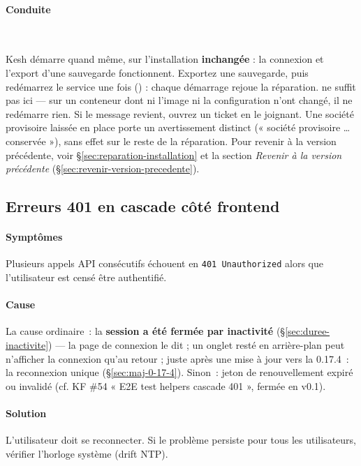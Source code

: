 \documentclass[a4paper,11pt,oneside]{article}
\begin{document}
\paragraph{Conduite}\mbox{}\\
\begin{sloppypar}
Kesh démarre quand même, sur l'installation \textbf{inchangée} : la connexion et l'export d'une sauvegarde fonctionnent. Exportez une sauvegarde, puis redémarrez le service une fois () : chaque démarrage rejoue la réparation.  ne suffit pas ici --- sur un conteneur dont ni l'image ni la configuration n'ont changé, il ne redémarre rien. Si le message revient, ouvrez un ticket en le joignant. Une société provisoire laissée en place porte un avertissement distinct (« société provisoire … conservée »), sans effet sur le reste de la réparation. Pour revenir à la version précédente, voir \S\ref{sec:reparation-installation} et la section \emph{Revenir à la version précédente} (\S\ref{sec:revenir-version-precedente}).
\end{sloppypar}

\subsection{Erreurs 401 en cascade côté frontend}

\paragraph{Symptômes} Plusieurs appels API consécutifs échouent en \texttt{401 Unauthorized} alors que l'utilisateur est censé être authentifié.

\paragraph{Cause} La cause ordinaire~: la \textbf{session a été fermée par inactivité} (\S\ref{sec:duree-inactivite}) --- la page de connexion le dit ; un onglet resté en arrière-plan peut n'afficher la connexion qu'au retour ; juste après une mise à jour vers la 0.17.4~: la reconnexion unique (\S\ref{sec:maj-0-17-4}). Sinon~: jeton de renouvellement expiré ou invalidé (cf. KF \#54 « E2E test helpers cascade 401 », fermée en v0.1).

\paragraph{Solution} L'utilisateur doit se reconnecter. Si le problème persiste pour tous les utilisateurs, vérifier l'horloge système (drift NTP).
\end{document}
